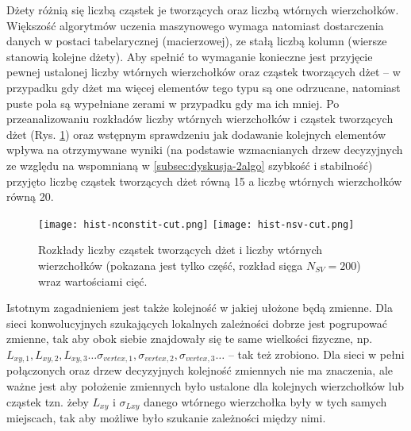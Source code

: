 \begin{itemize}
\begin{itemize}
	\end{itemize}
\end{itemize}

Dżety różnią się liczbą cząstek je tworzących oraz liczbą wtórnych wierzchołków. Większość algorytmów uczenia maszynowego wymaga natomiast dostarczenia danych w postaci tabelarycznej (macierzowej), ze stałą liczbą kolumn (wiersze stanowią kolejne dżety). Aby spełnić to wymaganie konieczne jest przyjęcie pewnej ustalonej liczby wtórnych wierzchołków oraz cząstek tworzących dżet -- w przypadku gdy dżet ma więcej elementów tego typu są one odrzucane, natomiast puste pola są wypełniane zerami w przypadku gdy ma ich mniej. 
Po przeanalizowaniu rozkładów liczby wtórnych wierzchołków i cząstek tworzących dżet (Rys. \ref{fig:nsv_nconstit_distr}) oraz wstępnym sprawdzeniu jak dodawanie kolejnych elementów wpływa na otrzymywane wyniki (na podstawie wzmacnianych drzew decyzyjnych ze względu na wspomnianą w \ref{subsec:dyskusja-2algo} szybkość i stabilność) przyjęto liczbę cząstek tworzących dżet równą 15 a liczbę wtórnych wierzchołków równą 20.

\begin{figure}[ht]
	\centering
	\texttt{[image: hist-nconstit-cut.png]}
	\texttt{[image: hist-nsv-cut.png]}
	\caption{Rozkłady liczby cząstek tworzących dżet i liczby wtórnych wierzchołków (pokazana jest tylko część, rozkład sięga $N_{SV} = 200$) wraz wartościami cięć.}
	\label{fig:nsv_nconstit_distr}
\end{figure}

Istotnym zagadnieniem jest także kolejność w jakiej ułożone będą zmienne. 
Dla sieci konwolucyjnych szukających lokalnych zależności dobrze jest pogrupować zmienne, tak aby obok siebie znajdowały się te same wielkości fizyczne, np. $L_{xy,1}, L_{xy,2}, L_{xy,3} \dots \sigma_{vertex,1}, \sigma_{vertex,2}, \sigma_{vertex,3} \dots$ -- tak też zrobiono.
Dla sieci w pełni połączonych oraz drzew decyzyjnych kolejność zmiennych nie ma znaczenia, ale ważne jest aby położenie zmiennych było ustalone dla kolejnych wierzchołków lub cząstek tzn. żeby $L_{xy}$ i $\sigma_{Lxy}$ danego wtórnego wierzchołka były w tych samych miejscach, tak aby możliwe było szukanie zależności między nimi.

